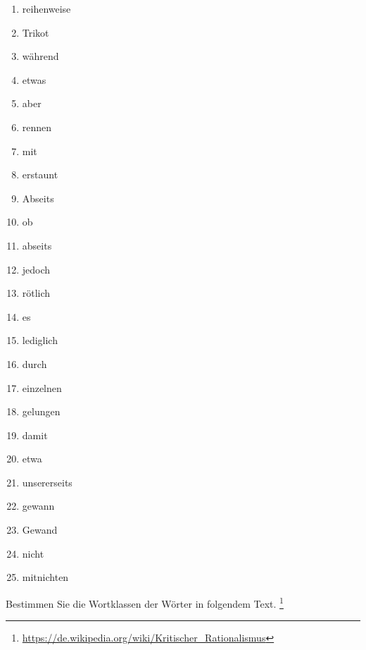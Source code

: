 \begin{enumerate}
  \item reihenweise
  \item Trikot
  \item während
  \item etwas
  \item aber
  \item rennen
  \item mit
  \item erstaunt
  \item Abseits
  \item ob
  \item abseits
  \item jedoch
  \item rötlich
  \item es
  \item lediglich
  \item durch
  \item einzelnen
  \item gelungen
  \item damit
  \item etwa
  \item unsererseits
  \item gewann
  \item Gewand
  \item nicht
  \item mitnichten
\end{enumerate}

\Uebung{} \label{exc:wortklassen06} Bestimmen Sie die Wortklassen der Wörter in folgendem Text.%
\footnote{\url{https://de.wikipedia.org/wiki/Kritischer_Rationalismus}}

